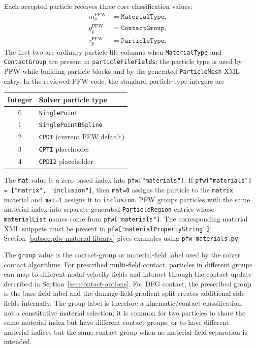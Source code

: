Each accepted particle receives three core classification values:
\begin{align}
  m_p^{\mathrm{PFW}} &= \texttt{MaterialType},\\
  g_p^{\mathrm{PFW}} &= \texttt{ContactGroup},\\
  \tau_p^{\mathrm{PFW}} &= \texttt{ParticleType}.
\end{align}
The first two are ordinary particle-file columns when \texttt{MaterialType} and \texttt{ContactGroup} are present in \texttt{particleFileFields}; the particle type is used by PFW while building particle blocks and by the generated \texttt{ParticleMesh} XML entry.  In the reviewed PFW code, the standard particle-type integers are
\begin{center}
\begin{tabular}{@{}cl@{}}
\toprule
\textbf{Integer} & \textbf{Solver particle type}\\
\midrule
0 & \texttt{SinglePoint}\\
1 & \texttt{SinglePointBSpline}\\
2 & \texttt{CPDI} (current PFW default)\\
3 & \texttt{CPTI} placeholder\\
4 & \texttt{CPDI2} placeholder\\
\bottomrule
\end{tabular}
\end{center}

The \texttt{mat} value is a zero-based index into \texttt{pfw["materials"]}.  If \texttt{pfw["materials"] = ["matrix", "inclusion"]}, then \texttt{mat=0} assigns the particle to the \texttt{matrix} material and \texttt{mat=1} assigns it to \texttt{inclusion}.  PFW groups particles with the same material index into separate generated \texttt{ParticleRegion} entries whose \texttt{materialList} names come from \texttt{pfw["materials"]}.  The corresponding material XML snippets must be present in \texttt{pfw["materialPropertyString"]}; Section~\ref{subsec:pfw-material-library} gives examples using \texttt{pfw\_materials.py}.

The \texttt{group} value is the contact-group or material-field label used by the solver contact algorithms.  For prescribed multi-field contact, particles in different groups can map to different nodal velocity fields and interact through the contact update described in Section~\ref{sec:contact-options}.  For DFG contact, the prescribed group is the base field label and the damage-field-gradient split creates additional side fields internally.  The group label is therefore a kinematic/contact classification, not a constitutive material selection; it is common for two particles to share the same material index but have different contact groups, or to have different material indices but the same contact group when no material-field separation is intended.

